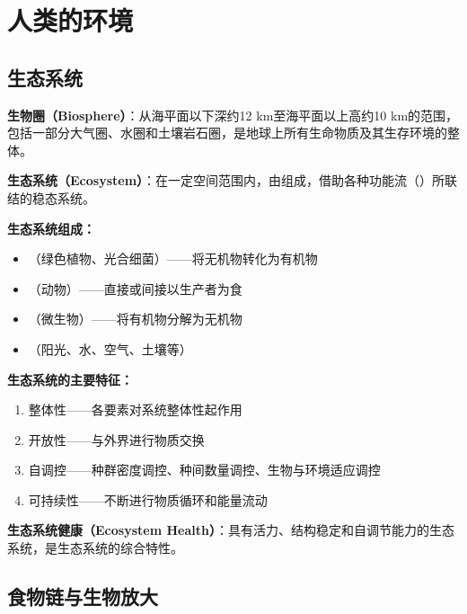 \documentclass[10pt,a4paper,oneside]{ctexbook}
\begin{document}
\section{人类的环境}

\subsection{生态系统}
\begin{defbox}
\textbf{生物圈（Biosphere）}：从海平面以下深约12 km至海平面以上高约10 km的范围，包括一部分大气圈、水圈和土壤岩石圈，是地球上所有生命物质及其生存环境的整体。
\end{defbox}

\begin{defbox}
\textbf{生态系统（Ecosystem）}：在一定空间范围内，由组成，借助各种功能流（）所联结的稳态系统。
\end{defbox}

\textbf{生态系统组成：}
\begin{itemize}[leftmargin=*]
    \item {}（绿色植物、光合细菌）——将无机物转化为有机物
    \item {}（动物）——直接或间接以生产者为食
    \item {}（微生物）——将有机物分解为无机物
    \item {}（阳光、水、空气、土壤等）
\end{itemize}

\textbf{生态系统的主要特征：}
\begin{enumerate}[leftmargin=*]
    \item 整体性——各要素对系统整体性起作用
    \item 开放性——与外界进行物质交换
    \item 自调控——种群密度调控、种间数量调控、生物与环境适应调控
    \item 可持续性——不断进行物质循环和能量流动
\end{enumerate}

\begin{defbox}
\textbf{生态系统健康（Ecosystem Health）}：具有活力、结构稳定和自调节能力的生态系统，是生态系统的综合特性。
\end{defbox}

\subsection{食物链与生物放大}
\end{document}
